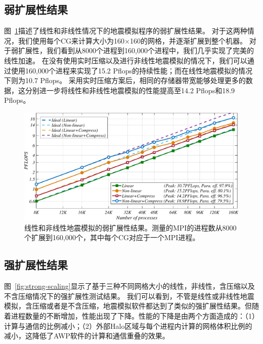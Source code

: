 \documentclass[degree=doctor]{thuthesis}
\begin{document}
\subsection{弱扩展性结果}

图~\ref {fig:weak-scaling}描述了线性和非线性情况下的地震模拟程序的弱扩展性结果。 对于这两种情况，我们使用每个CG来计算大小为160×160的网格，并逐渐扩展到整个机器。 对于弱扩展性，我们看到从8000个进程到160,000个进程中，我们几乎实现了完美的线性加速。 在没有使用实时压缩以及进行非线性地震模拟的情况下，我们可以通过使用160,000个进程来实现了15.2 Pflops的持续性能；而在线性地震模拟的情况下则为10.7 Pflops。 采用实时压缩方案后，相同的存储器带宽能够处理更多的数据，这分别进一步将线性和非线性地震模拟的性能提高至14.2 Pflops和18.9 Pflops。

\begin{figure}[h]
\centering
\includegraphics[width=0.9\columnwidth]{weak_scaling.pdf}
\caption{线性和非线性地震模拟的弱扩展性结果。测量的MPI的进程数从8000个扩展到160,000个，其中每个CG对应于一个MPI进程。}
\label{fig:weak-scaling}
\end{figure}

\subsection{强扩展性结果}

图~\ref {fig:strong-scaling}显示了基于三种不同网格大小的线性，非线性，含压缩以及不含压缩情况下的强扩展性测试结果。 我们可以看到，不管是线性或非线性地震模拟，含压缩或者是不含压缩，地震模拟软件都达到了类似的强扩展性结果。但随着进程数量的不断增加，性能出现了下降。性能的下降是由两个方面造成的：（1）计算与通信的比例减小；（2）外部Halo区域与每个进程内计算的网格体积比例的减小，这降低了AWP软件的计算和通信重叠的效果。
\end{document}
